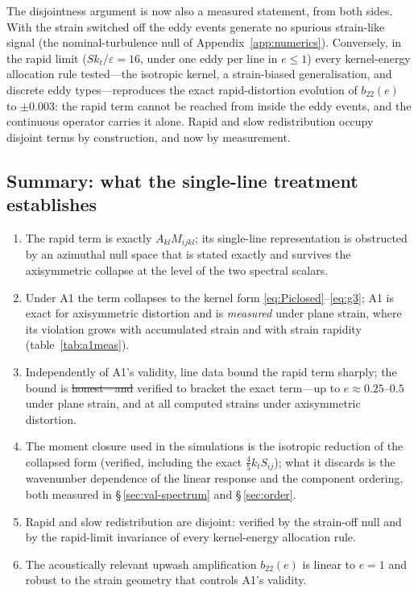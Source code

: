 \documentclass[lineno]{JFM-FLM_Au}
\providecommand{\DIFadd}[1]{{\protect\color{blue}\uwave{#1}}} %
\providecommand{\DIFdel}[1]{{\protect\color{red}\sout{#1}}} %
\providecommand{\DIFaddbegin}{} %
\providecommand{\DIFaddend}{} %
\providecommand{\DIFdelbegin}{} %
\providecommand{\DIFdelend}{} %
\begin{document}
The disjointness argument is now also a measured statement, from both
sides. With the strain switched off the eddy events generate no spurious
strain-like signal (the nominal-turbulence null of
Appendix~\ref{app:numerics}). Conversely, in the rapid limit
($Sk_t/\varepsilon=16$, under one eddy per line in $e\le1$) every
kernel-energy allocation rule tested---the isotropic kernel, a
strain-biased generalisation, and discrete eddy types---reproduces the
exact rapid-distortion evolution of $b_{22}(e)$ to $\pm0.003$: the rapid
term cannot be reached from inside the eddy events, and the continuous
operator carries it alone. Rapid and slow redistribution occupy disjoint
terms by construction, and now by measurement.

\subsection{Summary: what the single-line treatment establishes}
\label{sec:gate-summary}

\begin{enumerate}
\item The rapid term is exactly $A_{kl}M_{ijkl}$; its single-line
  representation is obstructed by an azimuthal null space that is stated
  exactly and survives the axisymmetric collapse at the level of the two
  spectral scalars.
\item Under A1 the term collapses to the kernel form
  \eqref{eq:Piclosed}--\eqref{eq:g3}; A1 is exact for axisymmetric
  distortion and is \emph{measured} under plane strain, where its violation
  grows with accumulated strain and with strain rapidity
  (table~\ref{tab:a1meas}).
\item Independently of A1's validity, line data bound the rapid term
  sharply; the bound is \DIFdelbegin \DIFdel{honest---and }\DIFdelend \DIFaddbegin \DIFadd{valid---and }\DIFaddend verified to bracket the exact
  term---up to $e\approx0.25$--$0.5$ under plane strain, and at all
  computed strains under axisymmetric distortion.
\item The moment closure used in the simulations is the isotropic reduction
  of the collapsed form (verified, including the exact
  $\tfrac45k_tS_{ij}$); what it discards is the wavenumber dependence of
  the linear response and the component ordering, both measured in
  \S\,\ref{sec:val-spectrum} and \S\,\ref{sec:order}.
\item Rapid and slow redistribution are disjoint: verified by the
  strain-off null and by the rapid-limit invariance of every kernel-energy
  allocation rule.
\item The acoustically relevant upwash amplification $b_{22}(e)$ is linear
  to $e=1$ and robust to the strain geometry that controls A1's validity.
\end{enumerate}
\end{document}
